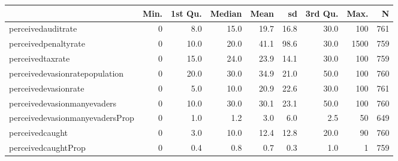 \begin{table}[ht]
\centering
\begin{tabular}{lrrrrrrrr}
  \hline
 & Min. & 1st Qu. & Median & Mean & sd & 3rd Qu. & Max. & N \\ 
  \hline
perceivedauditrate &  0 & 8.0 & 15.0 & 19.7 & 16.8 & 30.0 & 100 & 761 \\ 
  perceivedpenaltyrate &  0 & 10.0 & 20.0 & 41.1 & 98.6 & 30.0 & 1500 & 759 \\ 
  perceivedtaxrate &  0 & 15.0 & 24.0 & 23.9 & 14.1 & 30.0 & 100 & 759 \\ 
  perceivedevasionratepopulation &  0 & 20.0 & 30.0 & 34.9 & 21.0 & 50.0 & 100 & 760 \\ 
  perceivedevasionrate &  0 & 5.0 & 10.0 & 20.9 & 22.6 & 30.0 & 100 & 761 \\ 
  perceivedevasionmanyevaders &  0 & 10.0 & 30.0 & 30.1 & 23.1 & 50.0 & 100 & 760 \\ 
  perceivedevasionmanyevadersProp &  0 & 1.0 & 1.2 & 3.0 & 6.0 & 2.5 & 50 & 649 \\ 
  perceivedcaught &  0 & 3.0 & 10.0 & 12.4 & 12.8 & 20.0 & 90 & 760 \\ 
  perceivedcaughtProp &  0 & 0.4 & 0.8 & 0.7 & 0.3 & 1.0 &  1 & 759 \\ 
   \hline
\end{tabular}
\end{table}
